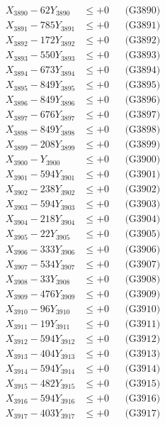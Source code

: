 \documentclass[a4paper,10pt]{article}
\begin{document}
{\begin{align}
X_{3890} - 62Y_{3890} &\leq +0 && \text{(G3890)} \\
\allowbreak
X_{3891} - 785Y_{3891} &\leq +0 && \text{(G3891)} \\
X_{3892} - 172Y_{3892} &\leq +0 && \text{(G3892)} \\
X_{3893} - 550Y_{3893} &\leq +0 && \text{(G3893)} \\
X_{3894} - 673Y_{3894} &\leq +0 && \text{(G3894)} \\
X_{3895} - 849Y_{3895} &\leq +0 && \text{(G3895)} \\
X_{3896} - 849Y_{3896} &\leq +0 && \text{(G3896)} \\
X_{3897} - 676Y_{3897} &\leq +0 && \text{(G3897)} \\
X_{3898} - 849Y_{3898} &\leq +0 && \text{(G3898)} \\
X_{3899} - 208Y_{3899} &\leq +0 && \text{(G3899)} \\
X_{3900} - Y_{3900} &\leq +0 && \text{(G3900)} \\
\allowbreak
X_{3901} - 594Y_{3901} &\leq +0 && \text{(G3901)} \\
X_{3902} - 238Y_{3902} &\leq +0 && \text{(G3902)} \\
X_{3903} - 594Y_{3903} &\leq +0 && \text{(G3903)} \\
X_{3904} - 218Y_{3904} &\leq +0 && \text{(G3904)} \\
X_{3905} - 22Y_{3905} &\leq +0 && \text{(G3905)} \\
X_{3906} - 333Y_{3906} &\leq +0 && \text{(G3906)} \\
X_{3907} - 534Y_{3907} &\leq +0 && \text{(G3907)} \\
X_{3908} - 33Y_{3908} &\leq +0 && \text{(G3908)} \\
X_{3909} - 476Y_{3909} &\leq +0 && \text{(G3909)} \\
X_{3910} - 96Y_{3910} &\leq +0 && \text{(G3910)} \\
\allowbreak
X_{3911} - 19Y_{3911} &\leq +0 && \text{(G3911)} \\
X_{3912} - 594Y_{3912} &\leq +0 && \text{(G3912)} \\
X_{3913} - 404Y_{3913} &\leq +0 && \text{(G3913)} \\
X_{3914} - 594Y_{3914} &\leq +0 && \text{(G3914)} \\
X_{3915} - 482Y_{3915} &\leq +0 && \text{(G3915)} \\
X_{3916} - 594Y_{3916} &\leq +0 && \text{(G3916)} \\
X_{3917} - 403Y_{3917} &\leq +0 && \text{(G3917)} \\

\end{align}}
\end{document}
